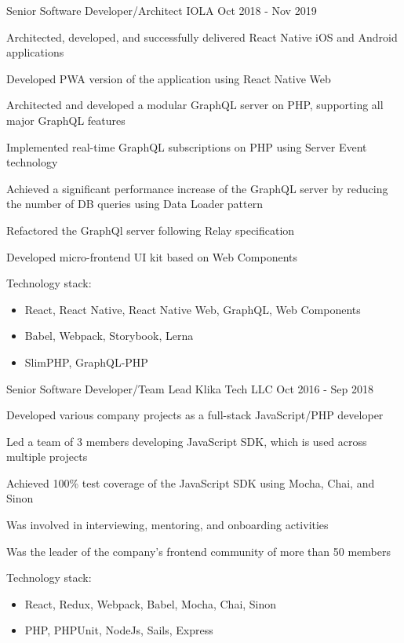 \begin{cventries}
  \cventry
    {Senior Software Developer/Architect} %
    {IOLA} %
    {} %
    {Oct 2018 - Nov 2019} %
    {
      \begin{cvitems}
        \item Architected, developed, and successfully delivered React Native iOS and Android applications
        \item Developed PWA version of the application using React Native Web
        \item Architected and developed a modular GraphQL server on PHP, supporting all major GraphQL features
        \item Implemented real-time GraphQL subscriptions on PHP using Server Event technology
        \item Achieved a significant performance increase of the GraphQL server by reducing the number of DB queries using Data Loader pattern
        \item Refactored the GraphQl server following Relay specification
        \item Developed micro-frontend UI kit based on Web Components
      \end{cvitems}
      \vspace{5mm}
      Technology stack:
      \begin{itemize}[leftmargin=2ex, nosep, noitemsep]
        \item React, React Native, React Native Web, GraphQL, Web Components
        \item Babel, Webpack, Storybook, Lerna
        \item SlimPHP, GraphQL-PHP
      \end{itemize}
      \vspace{-4.0mm}
    }

  \cventry
    {Senior Software Developer/Team Lead} %
    {Klika Tech LLC} %
    {} %
    {Oct 2016 - Sep 2018} %
    {
      \begin{cvitems}
        \item Developed various company projects as a full-stack JavaScript/PHP developer
        \item Led a team of 3 members developing JavaScript SDK, which is used across multiple projects
        \item Achieved 100\% test coverage of the JavaScript SDK using Mocha, Chai, and Sinon
        \item Was involved in interviewing, mentoring, and onboarding activities
        \item Was the leader of the company's frontend community of more than 50 members
      \end{cvitems}
      \vspace{5mm}
      Technology stack:
      \begin{itemize}[leftmargin=2ex, nosep, noitemsep]
        \item React, Redux, Webpack, Babel, Mocha, Chai, Sinon
        \item PHP, PHPUnit, NodeJs, Sails, Express
      \end{itemize}
      \vspace{-4.0mm}
    }


\end{cventries}
